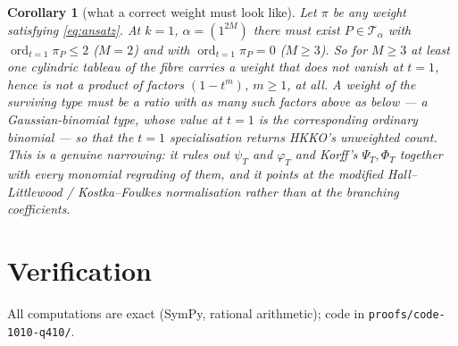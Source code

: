 \documentclass[11pt]{article}
\newtheorem{corollary}[theorem]{Corollary}
\theoremstyle{definition}
\DeclareMathOperator{\ord}{ord}
\newcommand{\T}{\mathcal{T}}
\begin{document}
\begin{corollary}[what a correct weight must look like]\label{cor:survives}
Let $\pi$ be any weight satisfying \eqref{eq:ansatz}. At $k=1$,
$\alpha=(1^{2M})$ there must exist $P\in\T_\alpha$ with
$\ord_{t=1}\pi_P\le2$ ($M=2$) and with $\ord_{t=1}\pi_P=0$ ($M\ge3$). So for
$M\ge3$ at least one cylindric tableau of the fibre carries a weight that does
\emph{not} vanish at $t=1$, hence is not a product of factors $(1-t^{m})$,
$m\ge1$, at all. A weight of the surviving type must be a ratio with as many
such factors above as below --- a Gaussian-binomial type, whose value at $t=1$
is the corresponding ordinary binomial --- so that the $t=1$ specialisation
returns HKKO's unweighted count. This is a genuine narrowing: it rules out
$\psi_T$ and $\varphi_T$ and Korff's $\Psi_T,\Phi_T$ together with every
monomial regrading of them, and it points at the modified Hall--Littlewood /
Kostka--Foulkes normalisation rather than at the branching coefficients.
\end{corollary}

\section{Verification}

All computations are exact (SymPy, rational arithmetic); code in
\texttt{proofs/code-1010-q410/}.
\end{document}
